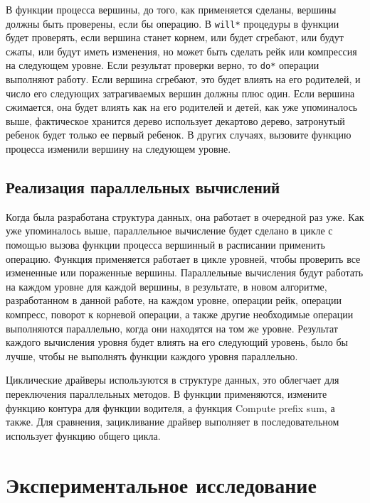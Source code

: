 \documentclass[specification,annotation,times]{itmo-student-thesis}
\newcommand{\revise}[1]{{\color{red!70!black} #1 }}
\begin{document}
\revise{
В функции процесса вершины, до того, как применяется сделаны, вершины должны быть проверены, если бы операцию. В \texttt{will{\textunderscore}*} процедуры в функции будет проверять, если вершина станет 
корнем, или будет сгребают, 
или будут сжаты, или будут иметь изменения, но может быть сделать рейк или компрессия на следующем уровне. Если результат проверки верно, то \texttt{do{\textunderscore}*} операции выполняют работу. Если 
вершина сгребают, 
это будет влиять на его родителей, и число его следующих затрагиваемых вершин должны плюс один. Если вершина сжимается, она будет влиять как на его родителей и детей, как уже упоминалось выше, фактическое 
хранится дерево использует декартово дерево, затронутый ребенок будет только ее первый ребенок. В других случаях, вызовите функцию процесса изменили вершину на следующем уровне.
}

\section{Реализация параллельных вычислений}

\revise{
Когда была разработана структура данных, она работает в очередной раз уже. Как уже упоминалось выше, параллельное вычисление будет сделано в цикле с помощью вызова функции процесса вершинный в расписании 
применить операцию. Функция применяется работает в цикле уровней, чтобы проверить все измененные или пораженные вершины. Параллельные вычисления будут работать на каждом уровне для каждой вершины, в 
результате, в новом алгоритме, разработанном в данной работе, на каждом уровне, операции рейк, операции компресс, поворот к корневой операции, а также другие необходимые операции выполняются параллельно, 
когда они находятся на том же уровне. Результат каждого вычисления уровня будет влиять на его следующий уровень, было бы лучше, чтобы не выполнять функции каждого уровня параллельно.
}

\revise{
Циклические драйверы используются в структуре данных, это облегчает для переключения параллельных методов. В функции применяются, измените функцию контура для функции водителя, а функция Compute prefix 
sum, а также. Для сравнения, зацикливание драйвер выполняет в последовательном использует функцию общего цикла.
}

\chapterconclusion

\chapter{Экспериментальное исследование}
\end{document}
